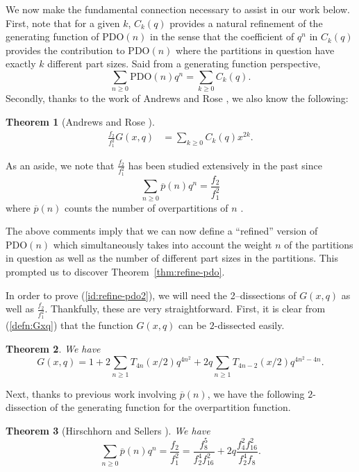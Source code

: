\documentclass[11pt,reqno]{amsart}
\numberwithin{equation}{section}
\theoremstyle{plain}
\newtheorem{theorem}{Theorem}[section]
\theoremstyle{definition}
\theoremstyle{named}
\def\PDO{\mathrm{PDO}}
\begin{document}
We now make the fundamental connection necessary to assist in our work below.  First, note that for a given $k$, $C_k(q)$ provides a natural refinement of the generating function of $\PDO(n)$ in the sense that the coefficient of $q^n$ in $C_k(q)$ provides the contribution to $\PDO(n)$ where the partitions in question have exactly $k$ different part sizes.  Said from a generating function perspective, 
$$
\sum_{n\geq 0} \PDO(n)q^n = \sum_{k\geq 0} C_k(q).
$$
Secondly, thanks to the work of Andrews and Rose \cite{AR13}, we also know the following:
\begin{theorem}[Andrews and Rose \cite{AR13}]
\begin{align}\label{id:G=Ck}
\frac{f_2}{f_1^2}G(x,q) &= \sum_{k\ge 0}C_k(q)x^{2k}.
\end{align}
\end{theorem}
As an aside, we note that $\displaystyle{\frac{f_2}{f_1^2}}$ has been studied extensively in the past since 
$$ 
\sum_{n\ge 0}\overline{p}(n)q^n =\frac{f_2}{f_1^2} 
$$ 
where $\overline{p}(n)$ counts the number of overpartitions of $n$ \cite{CL04}.  
 
The above comments imply that we can now define a ``refined'' version of $\PDO(n)$ which simultaneously takes into account the weight $n$ of the partitions in question as well as the number of different part sizes in the partitions. This prompted us to discover Theorem~\ref{thm:refine-pdo}.

In order to prove (\ref{id:refine-pdo2}), we will need the 2--dissections of $G(x,q)$ as well as $\displaystyle{\frac{f_2}{f_1^2}}$.  Thankfully, these are very straightforward.  First, it is clear from (\ref{defn:Gxq}) that the function $G(x,q)$ can be $2$-dissected easily. 
\begin{theorem}
\label{id:Gxq-2-dis}
We have 
\begin{equation*}
G(x,q) = 1+2\sum_{n\geq 1} T_{4n}\left({x}/{2}\right)q^{4n^2}+2q\sum_{n\geq 1} T_{4n-2}\left({x}/{2}\right)q^{4n^2-4n}.
\end{equation*}
\end{theorem}
Next, thanks to previous work involving $\overline{p}(n)$, we have the following $2$-dissection of the generating function for the overpartition function.
\begin{theorem}[Hirschhorn and Sellers \cite{HS05}]
\label{id:overpar-2-dis}
We have 
\begin{equation*}
\sum_{n\ge 0}\overline{p}(n)q^n =\frac{f_2}{f_1^2} =\frac{f_8^5}{f_2^4 f_{16}^2}+2q\frac{f_4^2 f_{16}^2}{f_2^4 f_8}.
\end{equation*}
\end{theorem}
\end{document}
